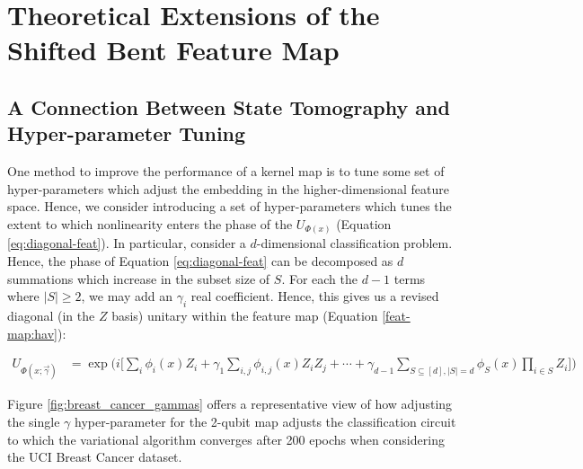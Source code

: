 \documentclass[main.tex]{subfiles}
\begin{document}
\section{Theoretical Extensions of the Shifted Bent Feature Map}

\subsection{A Connection Between State Tomography and Hyper-parameter Tuning}

One method to improve the performance of a kernel map is to tune some set of hyper-parameters which adjust the embedding in the higher-dimensional feature space. Hence, we consider introducing a set of hyper-parameters which tunes the extent to which nonlinearity enters the phase of the $U_{\Phi(x)}$ (Equation \ref{eq:diagonal-feat}). In particular, consider a $d$-dimensional classification problem. Hence, the phase of Equation \ref{eq:diagonal-feat} can be decomposed as $d$ summations which increase in the subset size of $S$. For each the $d-1$ terms where $|S| \geq 2$, we may add an $\gamma_i$ real coefficient. Hence, this gives us a revised diagonal (in the $Z$ basis) unitary within the feature map (Equation \ref{feat-map:hav}):

\begin{align*}
U_{\Phi(x; \vec{\gamma})} &= \exp\Big(i \Big[\sum_{i} \phi_i(x) Z_i + \gamma_1 \sum_{i,j} \phi_{i,j}(x) Z_i Z_j + \cdots +  \gamma_{d-1} \sum_{S \subseteq [d], |S| = d} \phi_S(x) \prod_{i \in S} Z_i \Big]\Big)	
\end{align*}

Figure \ref{fig:breast_cancer_gammas} offers a representative view of how adjusting the single $\gamma$ hyper-parameter for the 2-qubit map adjusts the classification circuit to which the variational algorithm converges after 200 epochs when considering the UCI Breast Cancer dataset.
\end{document}
